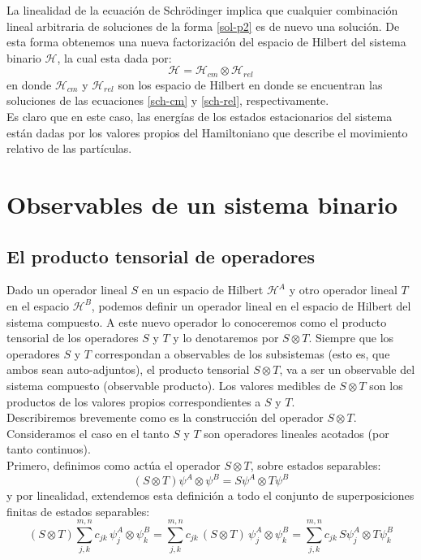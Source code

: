 \documentclass[12pt]{book}
\numberwithin{equation}{chapter}
\def\H{\mathcal{H}}
\def\pr{\otimes}
\begin{document}
La linealidad de la ecuaci\'on de Schr\"odinger implica que cualquier combinaci\'on lineal arbitraria de soluciones de la forma \eqref{sol-p2} es de nuevo una soluci\'on. De esta forma obtenemos una nueva factorizaci\'on del espacio de Hilbert del sistema binario $\H$, la cual esta dada por:
$$ \H=\H_{cm} \pr \H_{rel} $$
en donde $\H_{cm}$ y $\H_{rel}$ son los espacio de Hilbert en donde se encuentran las soluciones de las ecuaciones \eqref{sch-cm} y \eqref{sch-rel}, respectivamente.\\

Es claro que en este caso, las energ\'ias de los estados estacionarios del sistema est\'an dadas por los valores propios del Hamiltoniano que describe el movimiento relativo de las part\'iculas.

\newpage

\chapter{Observables de un sistema binario}

\section{El producto tensorial de operadores}
Dado un operador lineal $S$ en un espacio de Hilbert $\H^{A}$ y otro operador lineal $T$ en el espacio $\H^{B}$, podemos definir un operador lineal en el espacio de Hilbert del sistema compuesto. A este nuevo operador lo conoceremos como el producto tensorial de los operadores $S$ y $T$ y lo denotaremos por $S \pr T$. Siempre que los operadores $S$ y $T$ correspondan a observables de los subsistemas (esto es, que ambos sean auto-adjuntos), el producto tensorial $S \pr T$, va a ser un observable del sistema compuesto (observable producto). Los valores medibles de $S \pr T$ son los productos de los valores propios correspondientes a $S$ y $T$. \\
Describiremos brevemente como es la construcci\'on del operador $S \pr T$. Consideramos el caso en el tanto $S$ y $T$ son operadores lineales acotados (por tanto continuos). \\
Primero, definimos como act\'ua el operador $S \pr T$, sobre estados separables:
\begin{equation}\label{pro-op}
(S \pr T) \psi^{A} \pr \psi^{B}= S\psi^{A} \pr T\psi^{B} 
\end{equation}
y por linealidad, extendemos esta definici\'on a todo el conjunto de superposiciones finitas de estados separables:
\begin{equation}\label{op-tsum}
(S \pr T)\sum_{j,k}^{m,n} c_{jk}\, \psi_{j}^{A} \pr \psi_{k}^{B} = \sum_{j,k}^{m,n} c_{jk}\, (S \pr T)\, \psi_{j}^{A} \pr \psi_{k}^{B}=
\sum_{j,k}^{m,n} c_{jk}\, S\psi_{j}^{A} \pr T\psi_{k}^{B}
\end{equation}
\end{document}
